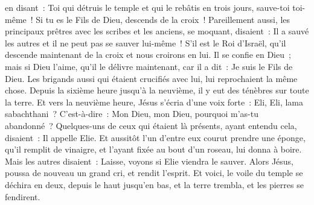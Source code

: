\begin{multicols}{2}
en disant~: Toi qui détruis le temple et qui le rebâtis en trois jours, sauve-toi toi-même~! Si tu es le Fils de Dieu, descends de la croix~!
Pareillement aussi, les principaux prêtres avec les scribes et les anciens, se moquant, disaient~:
Il a sauvé les autres et il ne peut pas se sauver lui-même~! S'il est le Roi d'Israël, qu'il descende maintenant de la croix et nous croirons en lui.
Il se confie en Dieu~; mais si Dieu l'aime, qu'il le délivre maintenant, car il a dit~: Je suis le Fils de Dieu.
Les brigands aussi qui étaient crucifiés avec lui, lui reprochaient la même chose.
Depuis la sixième heure jusqu'à la neuvième, il y eut des ténèbres sur toute la terre.
Et vers la neuvième heure, Jésus s'écria d'une voix forte~: Eli, Eli, lama sabachthani~? C'est-à-dire~: Mon Dieu, mon Dieu, pourquoi m'as-tu abandonné~?
Quelques-uns de ceux qui étaient là présents, ayant entendu cela, disaient~: Il appelle Elie.
Et aussitôt l'un d'entre eux courut prendre une éponge, qu'il remplit de vinaigre, et l'ayant fixée au bout d'un roseau, lui donna à boire.
Mais les autres disaient~: Laisse, voyons si Elie viendra le sauver.
Alors Jésus, poussa de nouveau un grand cri, et rendit l'esprit.
Et voici, le voile du temple se déchira en deux, depuis le haut jusqu'en bas, et la terre trembla, et les pierres se fendirent.

\end{multicols}
